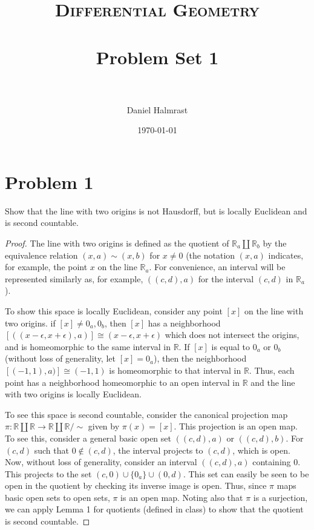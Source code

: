 \documentclass[fontsize=11pt]{scrartcl} %
\title{	
\normalfont \normalsize 
\textsc{Differential Geometry} \\ [25pt] %
\horrule{0.5pt} \\[0.4cm] %
\huge Problem Set 1\\ %
\horrule{2pt} \\[0.5cm] %
}
\author{Daniel Halmrast} %
\date{\normalsize\today} %
\numberwithin{equation}{section} %
\numberwithin{figure}{section} %
\numberwithin{table}{section} %
\begin{document}
\maketitle %


\section*{Problem 1}
Show that the line with two origins is not Hausdorff, but is locally Euclidean and is
second countable.
\\
\begin{proof}
The line with two origins is defined as the quotient of $\mathbb{R}_a\coprod\mathbb{R}_b$ by
the equivalence relation $(x, a) \sim (x, b)$ for $x \neq 0$ (the notation $(x,a)$ indicates,
for example, the point $x$ on the line $\mathbb{R}_a$. For convenience, an interval will be
represented similarly as, for example, $((c,d),a)$ for the interval $(c,d)$ in $\mathbb{R}_a$).

To show this space is locally Euclidean, consider any point $[x]$ on the line with two
origins. if $[x] \neq 0_a, 0_b$, then $[x]$ has a neighborhood $[((x-\epsilon,
x+\epsilon),a)] \cong (x-\epsilon, x+\epsilon)$ which does not intersect the origins, and
is homeomorphic to the same interval in $\mathbb{R}$.  If $[x]$ is equal to $0_a$ or $0_b$
(without loss of generality, let $[x] = 0_a$), then the neighborhood $[(-1,1),a)] \cong
(-1,1)$ is homeomorphic to that interval in $\mathbb{R}$.  Thus, each point has a
neighborhood homeomorphic to an open interval in $\mathbb{R}$ and the line with two
origins is locally Euclidean.

To see this space is second countable, consider the canonical projection map $\pi :
\mathbb{R}\coprod\mathbb{R} \to \mathbb{R}\coprod\mathbb{R}/{\sim}$ given by $\pi(x) =
[x]$. This projection is an open map. To see this, consider a general basic open set
$((c,d),a)$ or $((c,d),b)$. For $(c,d)$ such that $0\not\in(c,d)$, the interval projects
to $(c,d)$, which is open. Now, without loss of generality, consider an interval
$((c,d),a)$ containing $0$. This projects to the set $(c,0)\cup\{0_a\}\cup(0,d)$. This set
can easily be seen to be open in the quotient by checking its inverse image is open. Thus,
since $\pi$ maps basic open sets to open sets, $\pi$ is an open map. Noting also that
$\pi$ is a surjection, we can apply Lemma 1 for quotients (defined in class) to show that
the quotient is second countable.


\end{proof}
\end{document}
